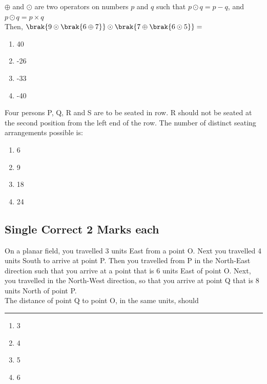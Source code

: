 \item $\oplus$ and $\odot$ are two operators on numbers $p$ and $q$ such that $p \odot q = p - q$, and $p \odot q = p \times q$\\
Then, $\brak{9 \odot \brak{6 \oplus 7}} \odot \brak{7 \oplus \brak{6 \odot 5}} = $
\begin{multicols}{2}
    \begin{enumerate}
        \item 40
        \item -26
        \item -33
        \item -40
    \end{enumerate}
\end{multicols}

\item Four persons P, Q, R and S are to be seated in row. R should not be seated at the second position from the left end of the row. The number of distinct seating arrangements possible is:
\begin{multicols}{2}
    \begin{enumerate}
        \item 6
        \item 9
        \item 18
        \item 24
    \end{enumerate}
\end{multicols}

\subsection*{Single Correct 2 Marks each}
\item On a planar field, you travelled 3 units East from a point O. Next you travelled 4 units South to arrive at point P. Then you travelled from P in the North-East direction such that you arrive at a point that is 6 units East of point O. Next, you travelled in the North-West direction, so that you arrive at point Q that is 8 units North of point P.\\
The distance of point Q to point O, in the same units, should \rule{1cm}{0.15mm}
\begin{multicols}{2}
    \begin{enumerate}
        \item 3
        \item 4
        \item 5
        \item 6
    \end{enumerate}
\end{multicols}

